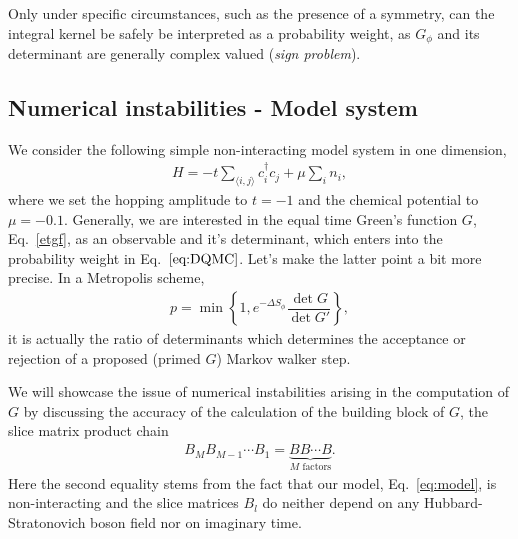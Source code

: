 \documentclass[%
 reprint,
superscriptaddress,
citeautoscript,
showpacs,
 amsmath,amssymb,
 aps,
 prb,
longbibliography,
]{revtex4-1}
\begin{document}
Only under specific circumstances, such as the presence of a symmetry, can the integral kernel be safely be interpreted as a probability weight, as $G_\phi$ and its determinant are generally complex valued (\textit{sign problem}).

\subsection{Numerical instabilities - Model system}

We consider the following simple non-interacting model system in one dimension,
\begin{align}
	H = -t\sum_{\langle i,j \rangle} c_i^\dagger c_j + \mu \sum_i n_i \label{eq:model},
\end{align}
where we set the hopping amplitude to $t=-1$ and the chemical potential to $\mu=-0.1$.
Generally, we are interested in the equal time Green's function $G$, Eq.~\eqref{etgf}, as an observable and it's determinant, which enters into the probability weight in Eq.~$\eqref{eq:DQMC}$. Let's make the latter point a bit more precise. In a Metropolis scheme,
\begin{align}
p = \min \left\{ 1 , e^{-\Delta S_\phi}  \dfrac{\det G}{\det G'} \right\}, \label{eq:metropolis}
\end{align}
it is actually the ratio of determinants which determines the acceptance or rejection of a proposed (primed $G$) Markov walker step.

We will showcase the issue of numerical instabilities arising in the computation of $G$ by discussing the accuracy of the calculation of the building block of $G$, the slice matrix product chain
\begin{align}
B_M B_{M-1} \cdots B_1 = \underbrace{B B \cdots B}_{M \textrm{ factors}}. \label{eq:Bchain}
\end{align}
Here the second equality stems from the fact that our model, Eq.~\ref{eq:model}, is non-interacting and the slice matrices $B_l$ do neither depend on any Hubbard-Stratonovich boson field nor on imaginary time.
\end{document}

